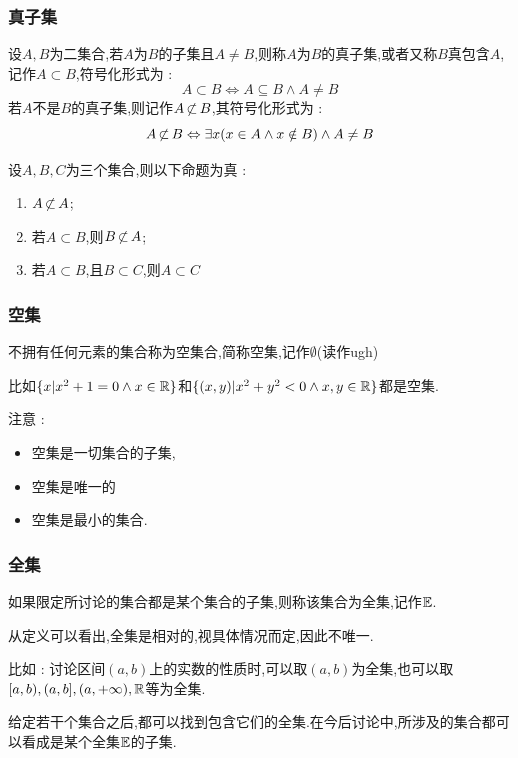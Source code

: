 {{\subsubsection{真子集}{
  设$A,B$为二集合,若$A$为$B$的子集且$A \neq B$,则称$A$为$B$的真子集,或者又称$B$真包含$A$,记作$A \subset B$,符号化形式为 : $$
    A \subset B \Leftrightarrow A \subseteq B \land A \neq B
  $$
  若$A$不是$B$的真子集,则记作$A \operatorname{\not\subset} B$,其符号化形式为 : $$
    A \operatorname{\not\subset} B \Leftrightarrow \exists x (x \in A \land x \notin B) \land A \neq B
  $$

  设$A,B,C$为三个集合,则以下命题为真 :

  \begin{enumerate}
    \item $A \operatorname{\not\subset} A$;
    \item 若$A \subset B$,则$B \operatorname{\not\subset} A$;
    \item 若$A \subset B$,且$B \subset C$,则$A \subset C$
  \end{enumerate}
}%

\subsubsection{空集}{
  不拥有任何元素的集合称为空集合,简称空集,记作$\emptyset$(读作ugh)

  比如$\{x | x^2 + 1 = 0 \land x \in \operatorname{\mathbb{R}}\}$和$\{(x,y) | x^2+y^2 < 0 \land x,y \in \operatorname{\mathbb{R}}\}$都是空集.

  注意 :

  \begin{itemize}
    \item 空集是一切集合的子集,
    \item 空集是唯一的
    \item 空集是最小的集合.
  \end{itemize}
}%

\subsubsection{全集}{
  如果限定所讨论的集合都是某个集合的子集,则称该集合为全集,记作$\operatorname{\mathbb{E}}$.

  从定义可以看出,全集是相对的,视具体情况而定,因此不唯一.

  比如 : 讨论区间$(a,b)$上的实数的性质时,可以取$(a,b)$为全集,也可以取$[a,b),(a,b],(a , +\infty),\operatorname{\mathbb{R}}$等为全集.

  给定若干个集合之后,都可以找到包含它们的全集.在今后讨论中,所涉及的集合都可以看成是某个全集$\operatorname{\mathbb{E}}$的子集.
}%

}}

